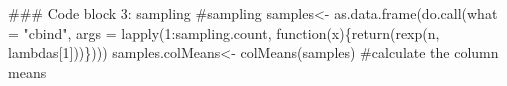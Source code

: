 \documentclass[]{article}
\newenvironment{Shaded}{}{}
\newcommand{\KeywordTok}[1]{\textcolor[rgb]{0.00,0.00,1.00}{{#1}}}
\newcommand{\DataTypeTok}[1]{{#1}}
\newcommand{\DecValTok}[1]{{#1}}
\newcommand{\StringTok}[1]{\textcolor[rgb]{0.00,0.50,0.50}{{#1}}}
\newcommand{\CommentTok}[1]{\textcolor[rgb]{0.00,0.50,0.00}{{#1}}}
\newcommand{\NormalTok}[1]{{#1}}
\begin{document}

\begin{Shaded}
\begin{Highlighting}[]
\NormalTok{### Code block 3: sampling}
\CommentTok{#sampling}
\NormalTok{samples<-}\StringTok{ }\KeywordTok{as.data.frame}\NormalTok{(}\KeywordTok{do.call}\NormalTok{(}\DataTypeTok{what =} \StringTok{"cbind"}\NormalTok{, }
                                \DataTypeTok{args =} \KeywordTok{lapply}\NormalTok{(}\DecValTok{1}\NormalTok{:sampling.count, }
                                              \NormalTok{function(x)\{}\KeywordTok{return}\NormalTok{(}\KeywordTok{rexp}\NormalTok{(n, lambdas[}\DecValTok{1}\NormalTok{]))\})))}
\NormalTok{samples.colMeans<-}\StringTok{ }\KeywordTok{colMeans}\NormalTok{(samples) }\CommentTok{#calculate the column means}
\end{Highlighting}
\end{Shaded}

\end{document}
